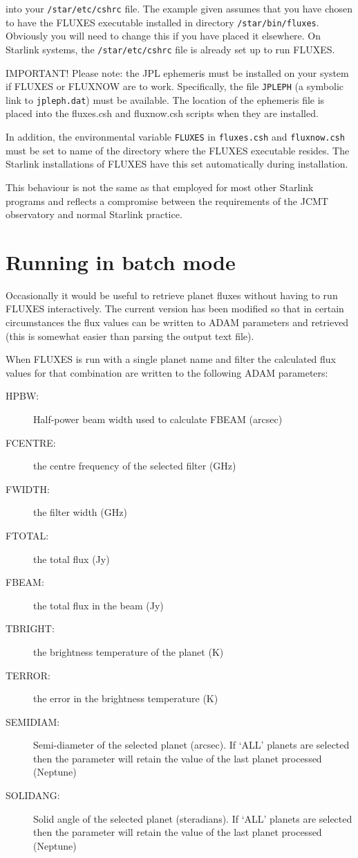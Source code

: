 \documentclass[11pt,twoside]{article}
\newcommand{\xref}[3]{#1}
\newcommand{\xlabel}[1]{}
\renewcommand{\_}{\texttt{\symbol{95}}}
\begin{document}
into your {\tt{/star/etc/cshrc}} file.  The example given assumes that
you have chosen to have the FLUXES executable installed in directory
{\tt{/star/bin/fluxes}}.  Obviously you will need to change this if you
have placed it elsewhere.   On Starlink systems, the
{\tt{/star/etc/cshrc}} file is already set up to run FLUXES.

IMPORTANT! Please note: the \xref{JPL ephemeris}{sun87}{} must be installed
on your system if FLUXES or FLUXNOW are to work. Specifically, the file
{\tt{JPLEPH}} (a symbolic link to {\tt{jpleph.dat}}) must be available.
The location of the ephemeris file is placed into the fluxes.csh and
fluxnow.csh scripts when they are installed.

In addition, the environmental variable {\tt{FLUXES}} in {\tt{fluxes.csh}}
and {\tt{fluxnow.csh}} must be set to name of the directory where the FLUXES
executable resides.  The Starlink installations of FLUXES have this set
automatically during installation.

This behaviour is not the same as that employed for most other Starlink
programs and reflects a compromise between the requirements of the JCMT
observatory and normal Starlink practice.


\section{Running in batch mode}
\xlabel{batch_mode}
\label{sec:batchmode}

Occasionally it would be useful to retrieve planet fluxes without having
to run FLUXES interactively. The current version has been modified so that
in certain circumstances the flux values can be written to ADAM parameters
and retrieved (this is somewhat easier than parsing the output text file).

When FLUXES is run with a single planet name and filter the calculated
flux values for that combination are written to the following 
ADAM parameters:

\begin{description}
\item[HPBW:] Half-power beam width used to calculate F\_BEAM (arcsec)
\item[F\_CENTRE:] the centre frequency of the selected filter (GHz)
\item[F\_WIDTH:] the filter width (GHz)
\item[F\_TOTAL:] the total flux (Jy)
\item[F\_BEAM:] the total flux in the beam (Jy)
\item[T\_BRIGHT:] the brightness temperature of the planet (K)
\item[T\_ERROR:] the error in the brightness temperature (K)
\item[SEMI\_DIAM:] Semi-diameter of the selected planet (arcsec).
If `ALL' planets are selected then the parameter will retain the 
value of the last planet processed (Neptune)
\item[SOLID\_ANG:] Solid angle of the selected planet (steradians).
If `ALL' planets are selected then the parameter will retain the 
value of the last planet processed (Neptune)
\end{description}
\end{document}
